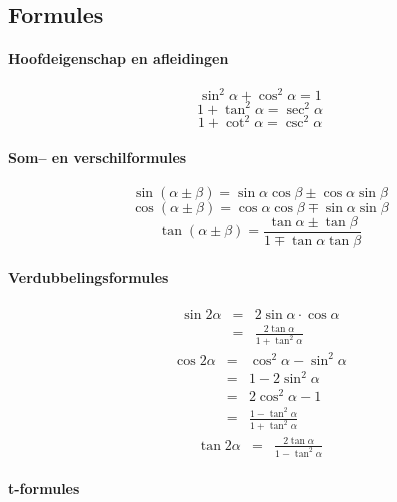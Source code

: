 \subsection{Formules}
\label{sec:GonioFormules}

\paragraph{Hoofdeigenschap en afleidingen}
\label{sec:HoofdeigenschapGonio}

   \[
	   \sin^2 \alpha + \cos^2 \alpha = 1
   \]
   \[
	   1 + \tan^2 \alpha = \sec^2 \alpha 
   \]
   \[
	   1 + \cot^2 \alpha = \csc^2 \alpha 
   \]
  
\paragraph{Som-- en verschilformules}
\label{sec:SomVerschilfGonio}

   \[
	   \sin( \alpha \pm \beta )  = \sin \alpha \cos \beta \pm \cos \alpha \sin \beta 
   \]
   \[
	   \cos( \alpha \pm \beta )  = \cos \alpha \cos \beta \mp \sin \alpha \sin \beta 
   \]
   \[
	   \tan( \alpha \pm \beta )  = \frac{\tan\alpha \pm \tan \beta}{1 \mp \tan\alpha\tan\beta} 
   \]
  
\paragraph{Verdubbelingsformules}
\label{sec:VerdubbelingsformulesGonio}
   \begin{eqnarray*}
	   \sin 2\alpha & = & 2 \sin \alpha \cdot \cos \alpha\\
	                & = & \frac{2 \tan \alpha }{1 + \tan^2 \alpha}
   \end{eqnarray*}
   \begin{eqnarray*}
	   \cos 2\alpha & = & \cos^2 \alpha - \sin^2 \alpha\\
	                & = & 1 - 2 \sin^2 \alpha\\
	                & = & 2 \cos^2 \alpha - 1\\
	                & = & \frac{1-\tan^2 \alpha}{1+\tan^2 \alpha}
   \end{eqnarray*}
   \begin{eqnarray*}
	   \tan 2\alpha & = & \frac{2 \tan \alpha}{1- \tan^2 \alpha}
   \end{eqnarray*}  
  
\paragraph{t-formules}
\label{sec:tFormulesGonio}

